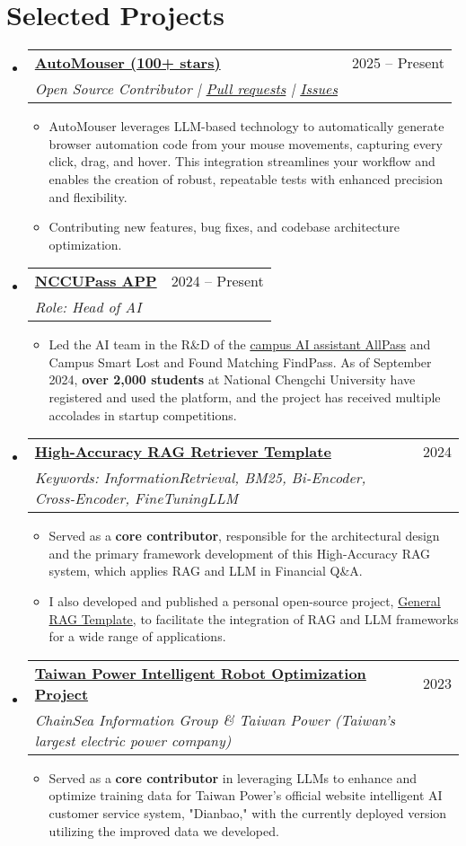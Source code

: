 \documentclass[letterpaper,10pt]{article}
\makeatletter
\newcommand{\resumeItem}[1]{
  \item\small{
    {#1 \vspace{-2pt}}
  }
}
\newcommand{\resumeSubheading}[4]{
  \vspace{-2pt}\item
    \begin{tabular*}{0.97\textwidth}[t]{l@{\extracolsep{\fill}}r}
      \textbf{#1} & #2 \\
      \textit{\small#3} & \textit{\small #4} \\
    \end{tabular*}\vspace{-7pt}
}
\newcommand{\resumeSubHeadingListStart}{\begin{itemize}[leftmargin=0.15in, label={}]}
\newcommand{\resumeSubHeadingListEnd}{\end{itemize}}
\newcommand{\resumeItemListStart}{\begin{itemize}}
\newcommand{\resumeItemListEnd}{\end{itemize}\vspace{-5pt}}
\makeatother
\begin{document}
\section{Selected Projects}
  \resumeSubHeadingListStart
    \resumeSubheading
      {\href{https://github.com/guoriyue/AutoMouser}{AutoMouser (100+ stars)}}{2025 -- Present}
      {Open Source Contributor | \href{https://github.com/guoriyue/AutoMouser/pulls?q=is\%3Apr+author\%3AJustinHsu1019+}{Pull requests} | \href{https://github.com/guoriyue/AutoMouser/issues?q=is\%3Aissue\%20author\%3AJustinHsu1019\%20}{Issues}}{}
      \resumeItemListStart
        \resumeItem{AutoMouser leverages LLM-based technology to automatically generate browser automation code from your mouse movements, capturing every click, drag, and hover. This integration streamlines your workflow and enables the creation of robust, repeatable tests with enhanced precision and flexibility.}
        \resumeItem{Contributing new features, bug fixes, and codebase architecture optimization.}
      \resumeItemListEnd

    \resumeSubheading
      {\href{https://nccupass.com/}{NCCUPass APP}}{2024 -- Present}
      {Role: Head of AI}{}
      \resumeItemListStart
        \resumeItem{Led the AI team in the R\&D of the \href{https://allpass.nccupass.com}{campus AI assistant AllPass} and Campus Smart Lost and Found Matching FindPass. As of September 2024, \textbf{over 2,000 students} at National Chengchi University have registered and used the platform, and the project has received multiple accolades in startup competitions.}
      \resumeItemListEnd

    \resumeSubheading
      {\href{https://github.com/JustinHsu1019/AICUP2024-RAG-LLM}{High-Accuracy RAG Retriever Template}}{2024}
      {Keywords: InformationRetrieval, BM25, Bi-Encoder, Cross-Encoder, FineTuningLLM}{}
      \resumeItemListStart
        \resumeItem{Served as a \textbf{core contributor}, responsible for the architectural design and the primary framework development of this High-Accuracy RAG system, which applies RAG and LLM in Financial Q\&A.}
        \resumeItem{I also developed and published a personal open-source project, \href{https://github.com/JustinHsu1019/general-rag-template}{General RAG Template}, to facilitate the integration of RAG and LLM frameworks for a wide range of applications.}
      \resumeItemListEnd

    \resumeSubheading
      {\href{https://service.taipower.com.tw:4433/smartrobot}{Taiwan Power Intelligent Robot Optimization Project}}{2023}
      {ChainSea Information Group \& Taiwan Power (Taiwan's largest electric power company)}{}
      \resumeItemListStart
        \resumeItem{Served as a \textbf{core contributor} in leveraging LLMs to enhance and optimize training data for Taiwan Power's official website intelligent AI customer service system, "Dianbao," with the currently deployed version utilizing the improved data we developed.}
      \resumeItemListEnd
  \resumeSubHeadingListEnd
\end{document}
